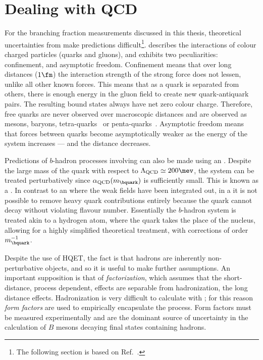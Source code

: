 \section{Dealing with QCD}

For the branching fraction measurements discussed in this thesis, theoretical uncertainties from \QCD make
predictions difficult\footnote{
  The following section is based on Ref.~\cite{Pich:1998xt}.
}.
\QCD describes the interactions of colour charged particles (quarks and
gluons),
and exhibits two peculiarities: confinement, and asymptotic freedom.
Confinement means that over long distances (\approx$1\fm$)
the interaction strength of the strong force does not lessen, unlike all other known
forces.
This means that as a quark is separated from others, there is enough energy in the gluon field to
create new quark-antiquark pairs.
The resulting bound states always have net zero colour charge.
Therefore, free quarks are never observed over macroscopic distances
and are observed as mesons, baryons, tetra-quarks~\cite{LHCb-PAPER-2014-014} or
penta-quarks~\cite{LHCb-PAPER-2015-029}.
Asymptotic freedom means that forces between quarks become asymptotically weaker as the energy of
the system increases --- and the distance decreases.

Predictions of $b$-hadron processes involving \QCD can also be made using an \EFT.
Despite the large mass of the \bquark quark with respect to $\Lambda_\mathrm{QCD}\simeq200\mev$,
the system can be treated perturbatively since $\alpha_\mathrm{QCD}(m_\bquark)$ is sufficiently
small.
This is known as a \HQET.
In contrast to an \EFT where the weak fields have been integrated out, in a \HQET
it is not possible to remove heavy quark contributions entirely because the \bquark quark
cannot decay without violating flavour number.
Essentially the $b$-hadron system is treated akin to a hydrogen atom, where the \bquark quark takes
the place of the nucleus, allowing for a highly simplified theoretical treatment, with corrections
of order $m_\bquark^{-1}$.

Despite the use of \gls{HQET}, the fact is that hadrons are inherently non-perturbative objects,
and so it is useful to make further assumptions.
An important supposition is that of \emph{factorization}, which assumes that the short-distance,
process dependent, \QCD effects are separable from hadronization, the long distance effects.
Hadronization is very difficult to calculate with \QCD; for this reason \emph{form factors} are
used to empirically encapsulate the process.
Form factors must be measured experimentally and are the dominant source of uncertainty in the
calculation of $B$ mesons decaying  final states containing hadrons.






